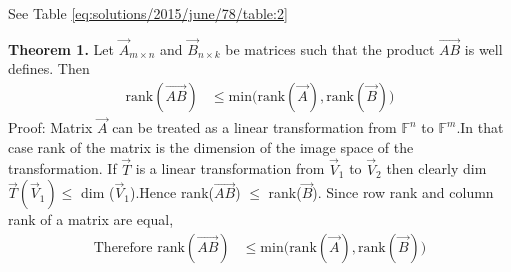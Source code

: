 See Table \ref{eq:solutions/2015/june/78/table:2}

{\textbf{Theorem 1.}}
Let $\vec{A}_{m \times n}$ and $\vec{B}_{n \times k}$ be matrices such that the product $\vec{AB}$ is well defines. Then\\
\begin{align}
    \mbox{rank}(\vec{AB})&\leq\mbox{min(rank}(\vec{A}),\mbox{rank}(\vec{B}))
\end{align}
Proof: Matrix $\vec{A}$ can be treated  as a linear transformation from $\mathbb{F}^n$ to $\mathbb{F}^m$.In that case rank of the matrix is the dimension of the image space of the transformation. If $\vec{T}$ is a linear
transformation from $\vec{V}_1$ to $\vec{V}_2$ then clearly dim $\vec{T}(\vec{V}_1)\leq$ dim ($\vec{V}_1$).Hence rank($\vec{AB}$) $\leq$ rank($\vec{B}$). Since row rank and column rank of a matrix are equal,
\begin{align}
    \mbox{Therefore rank}(\vec{AB})&\leq\mbox{min(rank}(\vec{A}),\mbox{rank}(\vec{B}))\label{eq:solutions/2015/june/78/eq:rank_of_AB}
\end{align}


